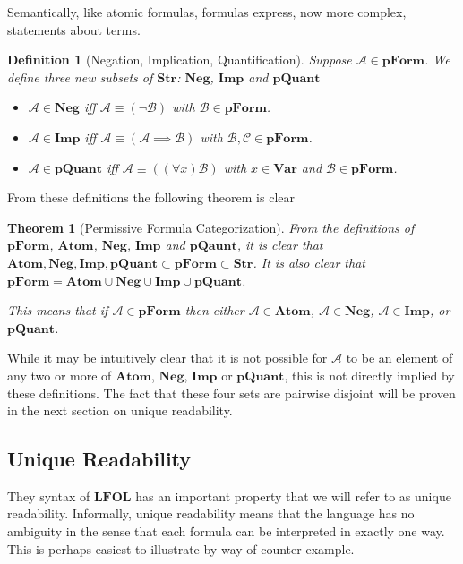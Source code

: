 \documentclass[12pt]{article}
\theoremstyle{break}
\newtheorem{definition}{Definition}[section]
\theoremstyle{break}
\newtheorem{theorem}{Theorem}[section]
\theoremstyle{break}
\theoremstyle{break}
\theoremstyle{break}
\newtheorem{informal definition}[definition]{Informal Definition}
\newcommand{\mc}[1]{\mathcal{#1}}
\begin{document}
Semantically, like atomic formulas, formulas express, now more complex, statements about terms.

\begin{definition}[Negation, Implication, Quantification]
Suppose $\mc{A}\in\textbf{pForm}$.
We define three new subsets of $\textbf{Str}$: $\textbf{Neg}$, $\textbf{Imp}$ and $\textbf{pQuant}$
\begin{itemize}
\item{$\mc{A}\in\textbf{Neg}$ iff $\mc{A}\equiv (\lnot \mc{B})$ with $\mc{B}\in\textbf{pForm}$.}
\item{$\mc{A}\in\textbf{Imp}$ iff $\mc{A}\equiv (\mc{A}\implies \mc{B})$ with $\mc{B}, \mc{C}\in\textbf{pForm}$.}
\item{$\mc{A}\in\textbf{pQuant}$ iff $\mc{A} \equiv ((\forall x)\mc{B})$ with $x\in\textbf{Var}$ and $\mc{B}\in\textbf{pForm}$.}
\end{itemize}
\end{definition}

From these definitions the following theorem is clear

\begin{theorem}[Permissive Formula Categorization]
\label{thm:synt:pformcats}
From the definitions of $\textbf{pForm}$, $\textbf{Atom}$, $\textbf{Neg}$, $\textbf{Imp}$ and $\textbf{pQaunt}$, it is clear that $\textbf{Atom}, \textbf{Neg}, \textbf{Imp}, \textbf{pQuant} \subset \textbf{pForm}\subset \textbf{Str}$.
It is also clear that $\textbf{pForm} = \textbf{Atom}\cup \textbf{Neg} \cup \textbf{Imp} \cup \textbf{pQuant}$.

This means that if $\mc{A}\in\textbf{pForm}$ then either $\mc{A}\in\textbf{Atom}$, $\mc{A}\in\textbf{Neg}$, $\mc{A}\in\textbf{Imp}$, or $\textbf{pQuant}$.
\end{theorem}

While it may be intuitively clear that it is not possible for $\mc{A}$ to be an element of any two or more of $\textbf{Atom}$, $\textbf{Neg}$, $\textbf{Imp}$ or $\textbf{pQuant}$, this is not directly implied by these definitions.
The fact that these four sets are pairwise disjoint will be proven in the next section on unique readability.

\subsection{Unique Readability}

They syntax of $\textbf{LFOL}$ has an important property that we will refer to as unique readability.
Informally, unique readability means that the language has no ambiguity in the sense that each formula can be interpreted in exactly one way.
This is perhaps easiest to illustrate by way of counter-example.
\end{document}
